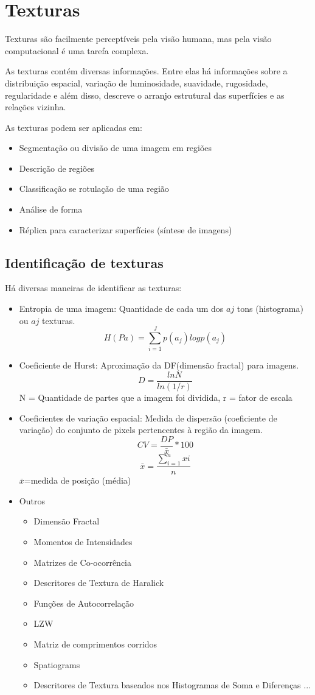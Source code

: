 \documentclass{article}
\begin{document}
\section{Texturas}
\label{sec:texturas}
Texturas são facilmente perceptíveis pela visão humana, mas pela visão computacional é uma tarefa complexa. 
\par As texturas contém diversas informações. Entre elas há informações sobre a distribuição espacial, variação de luminosidade, suavidade, rugosidade, regularidade e além disso, descreve o arranjo estrutural das superfícies e as relações vizinha.
\par As texturas podem ser aplicadas em:

\begin{itemize}
    \item Segmentação ou divisão de uma imagem em regiões
    \item Descrição de regiões
    \item Classificação se rotulação de uma região
    \item Análise de forma
    \item Réplica para caracterizar superfícies (síntese de imagens)
\end{itemize}

\subsection{Identificação de texturas}
Há diversas maneiras de identificar as texturas:
\begin{itemize}
    \item Entropia de uma imagem: Quantidade de cada um dos $aj$ tons (histograma) ou $aj$ texturas.
    $$H(Pa)=\sum_{i=1}^{J} p(a_{j})logp(a_{j})$$
    \item Coeficiente de Hurst: Aproximação da DF(dimensão fractal) para imagens. 
    $$D=\frac{lnN}{ln(1/r)}$$
    N = Quantidade de partes que a imagem foi dividida, r = fator de escala
    \item Coeficientes de variação espacial: Medida de dispersão (coeficiente de variação) do conjunto de pixels pertencentes à região da imagem.
    $$CV=\frac{DP}{\bar{x}}*100$$
    $$\bar{x}=\frac{\sum_{i=1}^{n} xi}{n}$$
    $\bar{x}$=medida de posição (média)
    \item Outros
    \begin{itemize}
        \item Dimensão Fractal
        \item Momentos de Intensidades
        \item Matrizes de Co-ocorrência
        \item Descritores de Textura de Haralick
        \item Funções de Autocorrelação
        \item LZW
        \item Matriz de comprimentos corridos
        \item Spatiograms
        \item Descritores de Textura baseados nos Histogramas de Soma e Diferenças ...
    \end{itemize}
\end{itemize}
\end{document}

